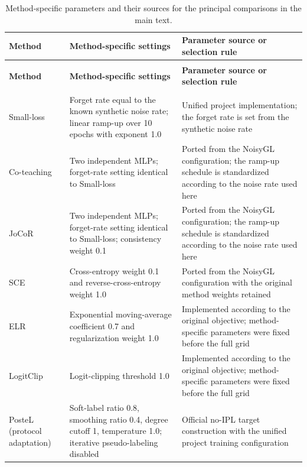 \documentclass[preprint,12pt]{elsarticle}
\newlength{\TableWidth}
\begin{document}
\begingroup
\fontsize{9.5}{12}\selectfont
\setlength{\tabcolsep}{3pt}
\renewcommand{\arraystretch}{1.18}
\setlength{\TableWidth}{\dimexpr\linewidth-4\tabcolsep\relax}
\begin{longtable}{@{}>{\raggedright\arraybackslash}p{\dimexpr 0.200000\TableWidth\relax}>{\raggedright\arraybackslash}p{\dimexpr 0.440000\TableWidth\relax}>{\raggedright\arraybackslash}p{\dimexpr 0.360000\TableWidth\relax}@{}}
\caption{Method-specific parameters and their sources for the principal comparisons in the main text.}\label{tab:G.2}\\
\toprule
\textbf{Method} & \textbf{Method-specific settings} & \textbf{Parameter source or selection rule} \\
\midrule\endfirsthead
\multicolumn{3}{l}{\small\itshape Table \thetable{} (continued)}\\
\toprule
\textbf{Method} & \textbf{Method-specific settings} & \textbf{Parameter source or selection rule} \\
\midrule\endhead
\midrule\multicolumn{3}{r}{\small\itshape Continued on the next page}\\\endfoot
\bottomrule\endlastfoot
Small-loss & Forget rate equal to the known synthetic noise rate; linear ramp-up over 10 epochs with exponent 1.0 & Unified project implementation; the forget rate is set from the synthetic noise rate \\
Co-teaching & Two independent MLPs; forget-rate setting identical to Small-loss & Ported from the NoisyGL configuration; the ramp-up schedule is standardized according to the noise rate used here \\
JoCoR & Two independent MLPs; forget-rate setting identical to Small-loss; consistency weight 0.1 & Ported from the NoisyGL configuration; the ramp-up schedule is standardized according to the noise rate used here \\
SCE & Cross-entropy weight 0.1 and reverse-cross-entropy weight 1.0 & Ported from the NoisyGL configuration with the original method weights retained \\
ELR & Exponential moving-average coefficient 0.7 and regularization weight 1.0 & Implemented according to the original objective; method-specific parameters were fixed before the full grid \\
LogitClip & Logit-clipping threshold 1.0 & Implemented according to the original objective; method-specific parameters were fixed before the full grid \\
PosteL (protocol adaptation) & Soft-label ratio 0.8, smoothing ratio 0.4, degree cutoff 1, temperature 1.0; iterative pseudo-labeling disabled & Official no-IPL target construction with the unified project training configuration \\

\end{longtable}
\end{document}
